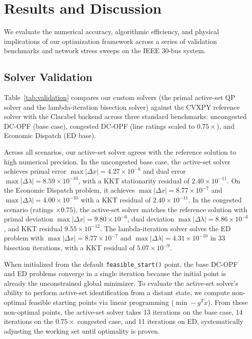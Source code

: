\section{Results and Discussion}
\label{sec:results}

We evaluate the numerical accuracy, algorithmic efficiency, and physical implications of our optimization framework across a series of validation benchmarks and network stress sweeps on the IEEE 30-bus system.

\subsection{Solver Validation}

Table~\ref{tab:validation} compares our custom solvers (the primal active-set QP solver and the lambda-iteration bisection solver) against the CVXPY reference solver with the Clarabel backend across three standard benchmarks: uncongested DC-OPF (base case), congested DC-OPF (line ratings scaled to $0.75\times$), and Economic Dispatch (ED base).

\begin{table}[htbp]
\centering
\caption{Solver comparison: cost, primal/dual error vs.\ reference, KKT stationarity residual, and iteration counts (from default start and non-optimal start).}
\label{tab:validation}

\end{table}

Across all scenarios, our active-set solver agrees with the reference solution to high numerical precision. In the uncongested base case, the active-set solver achieves primal error $\max |\Delta x| = 4.27 \times 10^{-8}$ and dual error $\max |\Delta \lambda| = 8.59 \times 10^{-10}$, with a KKT stationarity residual of $2.40 \times 10^{-11}$. On the Economic Dispatch problem, it achieves $\max |\Delta x| = 8.77 \times 10^{-7}$ and $\max |\Delta \lambda| = 4.00 \times 10^{-10}$ with a KKT residual of $2.40 \times 10^{-11}$. In the congested scenario (ratings $\times 0.75$), the active-set solver matches the reference solution with primal deviation $\max |\Delta x| = 9.80 \times 10^{-6}$, dual deviation $\max |\Delta \lambda| = 8.86 \times 10^{-6}$, and KKT residual $9.55 \times 10^{-12}$. The lambda-iteration solver solves the ED problem with $\max |\Delta x| = 8.77 \times 10^{-7}$ and $\max |\Delta \lambda| = 4.31 \times 10^{-10}$ in 33 bisection iterations, with a KKT residual of $5.07 \times 10^{-9}$.

When initialized from the default \texttt{feasible\_start()} point, the base DC-OPF and ED problems converge in a single iteration because the initial point is already the unconstrained global minimizer. To evaluate the active-set solver's ability to perform active-set identification from a distant state, we compute non-optimal feasible starting points via linear programming ($\min -g^T x$). From these non-optimal points, the active-set solver takes 13 iterations on the base case, 14 iterations on the $0.75\times$ congested case, and 11 iterations on ED, systematically adjusting the working set until optimality is proven.

